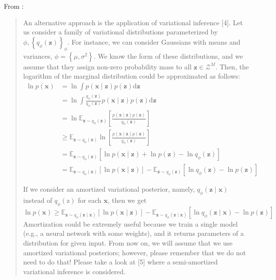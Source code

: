 \documentclass{article}
\begin{document}
\begin{appendix}
From \cite{deepgen}:

\blockquote{An alternative approach is the application of variational inference [4]. Let us consider a family of variational
distributions parameterized by $\phi,\left\{q_{\phi}(\mathbf{z})\right\}_{\phi}$. For instance, we can consider Gaussians with means and variances, $\phi=\left\{\mu, \sigma^{2}\right\}$. We know the form of these distributions, and we assume that they assign non-zero probability mass to all $\mathbf{z} \in \mathcal{Z}^{M}$. Then, the logarithm of the marginal distribution could be approximated as follows:
$$
\begin{aligned}
\ln p(\mathbf{x}) &=\ln \int p(\mathbf{x} \mid \mathbf{z}) p(\mathbf{z}) \mathrm{d} \mathbf{z} \\
&=\ln \int \frac{q_{\phi}(\mathbf{z})}{q_{\phi}(\mathbf{z})} p(\mathbf{x} \mid \mathbf{z}) p(\mathbf{z}) \mathrm{d} \mathbf{z} \\
&=\ln \mathbb{E}_{\mathbf{z} \sim q_{\phi}(\mathbf{z})}\left[\frac{p(\mathbf{x} \mid \mathbf{z}) p(\mathbf{z})}{q_{\phi}(\mathbf{z})}\right] \\
& \geq \mathbb{E}_{\mathbf{z} \sim q_{\phi}(\mathbf{z})} \ln \left[\frac{p(\mathbf{x} \mid \mathbf{z}) p(\mathbf{z})}{q_{\phi}(\mathbf{z})}\right] \\
&=\mathbb{E}_{\mathbf{z} \sim q_{\phi}(\mathbf{z})}\left[\ln p(\mathbf{x} \mid \mathbf{z})+\ln p(\mathbf{z})-\ln q_{\phi}(\mathbf{z})\right] \\
&=\mathbb{E}_{\mathbf{z} \sim q_{\phi}(\mathbf{z})}[\ln p(\mathbf{x} \mid \mathbf{z})]-\mathbb{E}_{\mathbf{z} \sim q_{\phi}(\mathbf{z})}\left[\ln q_{\phi}(\mathbf{z})-\ln p(\mathbf{z})\right]
\end{aligned}
$$

If we consider an amortized variational posterior, namely, $q_{\phi}(\mathbf{z} \mid \mathbf{x})$ instead of $q_{\phi}(\mathrm{z})$ for each $\mathbf{x}$, then we get
$$
\ln p(\mathbf{x}) \geq \mathbb{E}_{\mathbf{z} \sim q_{\phi}(\mathbf{z} \mid \mathbf{x})}[\ln p(\mathbf{x} \mid \mathbf{z})]-\mathbb{E}_{\mathbf{z} \sim q_{\phi}(\mathbf{z} \mid \mathbf{x})}\left[\ln q_{\phi}(\mathbf{z} \mid \mathbf{x})-\ln p(\mathbf{z})\right]
$$
Amortization could be extremely useful because we train a single model (e.g., a neural network with some weights), and it returns parameters of a distribution for given input. From now on, we will assume that we use amortized variational posteriors; however, please remember that we do not need to do that! Please take a look at [5] where a semi-amortized variational inference is considered.

}
\end{appendix}
\end{document}
